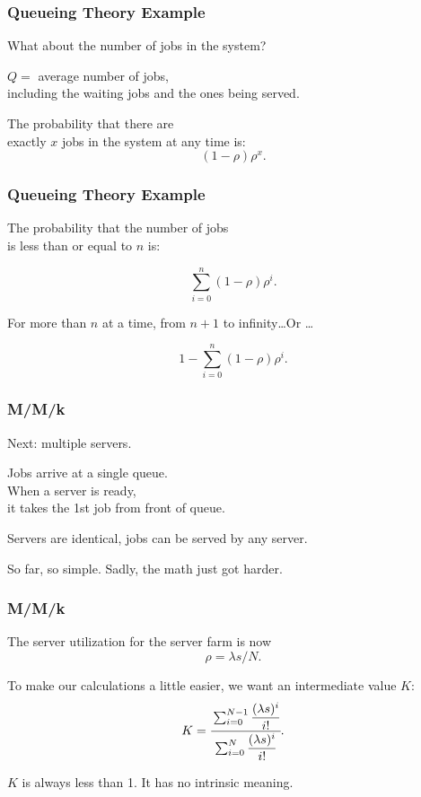 \begin{frame}
\frametitle{Queueing Theory Example}

\large
\begin{changemargin}{1.5cm}
What about the number of jobs in the system? 

$Q = $ average number of jobs, \\
including the waiting jobs and the ones being served.  

The probability that there are\\
 exactly $x$ jobs in the system at any time is: 
\[ (1-\rho)\rho^{x}.\]
\end{changemargin}

\end{frame}



\begin{frame}
\frametitle{Queueing Theory Example}

\large
\begin{changemargin}{1.5cm}
The probability that the number of jobs\\
 is less than or equal to $n$ is: 

\[ \sum\limits_{i=0}^{n}(1-\rho)\rho^{i}. \]

For more than $n$ at a time, from $n+1$ to infinity\ldots Or \ldots

\[ 1 - \sum\limits_{i=0}^{n}(1-\rho)\rho^{i}. \]
\end{changemargin}

\end{frame}



\begin{frame}
\frametitle{M/M/k}

\large
\begin{changemargin}{1.5cm}
Next: multiple servers.

Jobs arrive at a single queue. \\
When a server is ready, \\
it takes the 1st job from front of queue. 

Servers are identical, jobs can be served by any server. 

So far, so simple. Sadly, the math just got harder. 
\end{changemargin}

\end{frame}




\begin{frame}
\frametitle{M/M/k}

\large
\begin{changemargin}{1.5cm}
The server utilization for the server farm is now 
\[ \rho = \lambda s / N. \]

To make our calculations a little easier, we want an intermediate value $K$:
\[ K = \cfrac{\sum_{i=0}^{N-1}\dfrac{(\lambda s)^{i}}{i!}}{{\sum_{i=0}^{N}\dfrac{(\lambda s)^{i}}{i!}}}.\]

$K$ is always less than 1. It has no intrinsic meaning.
\end{changemargin}

\end{frame}

